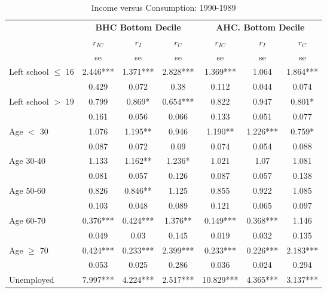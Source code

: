 \begin{table}
\caption{Income versus Consumption: 1990-1989}
\centering
\begin{tabular}{l|ccc|ccc}
\hline\hline 
	& \multicolumn{3}{c}{\textbf{BHC Bottom Decile}} &  \multicolumn{3}{c}{\textbf{AHC. Bottom Decile}} \\
	&	$r_{IC}$	&	$r_{I}$	&	$r_{C}$	&	$r_{IC}$	&	$r_{I}$	&	$r_{C}$	\\
  & se & se & se  & se & se & se \\
\hline
Left school $\leq$ 16	&	       2.446***	&	       1.371***	&	       2.828***	&	       1.369***	&	1.064	&	       1.864***	\\				
                    	&	       0.429   	&	0.072	&	0.38	&	       0.112   	&	0.044	&	0.074	\\				
Left school $>$ 19	&	       0.799   	&	       0.869*  	&	       0.654***	&	       0.822   	&	0.947	&	       0.801*  	\\				
                    	&	       0.161   	&	0.056	&	0.066	&	       0.133   	&	0.051	&	0.077	\\				
Age $<$ 30	&	       1.076   	&	       1.195** 	&	0.946	&	       1.190** 	&	       1.226***	&	       0.759*  	\\				
                    	&	       0.087   	&	0.072	&	0.09	&	       0.074   	&	0.054	&	0.088	\\				
Age 30-40	&	       1.133   	&	       1.162** 	&	       1.236*  	&	       1.021   	&	1.07	&	1.081	\\				
                    	&	       0.081   	&	0.057	&	0.126	&	       0.087   	&	0.057	&	0.138	\\				
Age 50-60	&	       0.826   	&	       0.846** 	&	1.125	&	       0.855   	&	0.922	&	1.085	\\				
                    	&	       0.103   	&	0.048	&	0.089	&	       0.121   	&	0.065	&	0.097	\\				
Age 60-70	&	       0.376***	&	       0.424***	&	       1.376** 	&	       0.149***	&	       0.368***	&	1.146	\\				
                    	&	       0.049   	&	0.03	&	0.145	&	       0.019   	&	0.032	&	0.135	\\				
Age $\geq$ 70	&	       0.424***	&	       0.233***	&	       2.399***	&	       0.233***	&	       0.226***	&	       2.183***	\\				
                    	&	       0.053   	&	0.025	&	0.286	&	       0.036   	&	0.024	&	0.294	\\				
Unemployed	&	       7.997***	&	       4.224***	&	       2.517***	&	      10.829***	&	       4.365***	&	       3.137***	\\				

\end{tabular}
\end{table}
